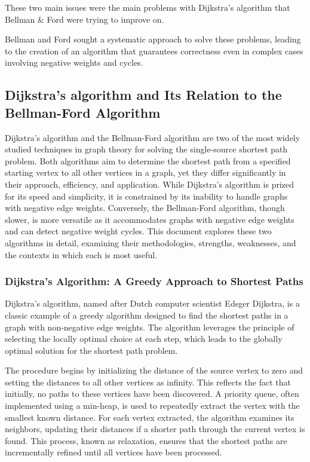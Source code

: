 \documentclass[12pt]{article}
\begin{document}
These two main issues were the main problems with Dijkstra's algorithm that Bellman \& Ford were trying to improve on.

Bellman and Ford sought a systematic approach to solve these problems, leading to the creation of an algorithm that guarantees correctness even in complex cases involving negative weights and cycles. \par


\subsection{Dijkstra's algorithm and Its Relation to the Bellman-Ford Algorithm}

Dijkstra's algorithm and the Bellman-Ford algorithm are two of the most widely studied techniques in graph theory for solving the single-source shortest path problem. Both algorithms aim to determine the shortest path from a specified starting vertex to all other vertices in a graph, yet they differ significantly in their approach, efficiency, and application. While Dijkstra's algorithm is prized for its speed and simplicity, it is constrained by its inability to handle graphs with negative edge weights. Conversely, the Bellman-Ford algorithm, though slower, is more versatile as it accommodates graphs with negative edge weights and can detect negative weight cycles. This document explores these two algorithms in detail, examining their methodologies, strengths, weaknesses, and the contexts in which each is most useful. \par

\subsubsection{Dijkstra's Algorithm: A Greedy Approach to Shortest Paths}

Dijkstra's algorithm, named after Dutch computer scientist Edsger Dijkstra, is a classic example of a greedy algorithm designed to find the shortest paths in a graph with non-negative edge weights. The algorithm leverages the principle of selecting the locally optimal choice at each step, which leads to the globally optimal solution for the shortest path problem. \par

The procedure begins by initializing the distance of the source vertex to zero and setting the distances to all other vertices as infinity. This reflects the fact that initially, no paths to these vertices have been discovered. A priority queue, often implemented using a min-heap, is used to repeatedly extract the vertex with the smallest known distance. For each vertex extracted, the algorithm examines its neighbors, updating their distances if a shorter path through the current vertex is found. This process, known as relaxation, ensures that the shortest paths are incrementally refined until all vertices have been processed. \par
\end{document}
